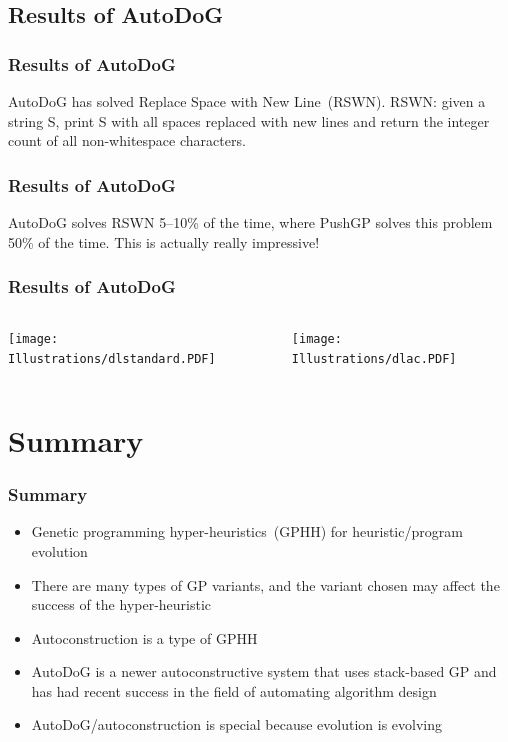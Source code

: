 \documentclass{beamer}
\newcommand{\linespace}{\vskip 0.25cm}
\begin{document}
\subsection{Results of AutoDoG}

\begin{frame}
	\frametitle{Results of AutoDoG}
	AutoDoG has solved Replace Space with New Line~(RSWN).
	\linespace
	\linespace
	\pause
	RSWN: given a string S, print S with all spaces replaced with new lines and return the integer count of all non-whitespace characters.
\end{frame}

\begin{frame}
	\frametitle{Results of AutoDoG}
	AutoDoG solves RSWN 5--10\% of the time, where PushGP solves this problem 50\% of the time.
	\linespace
	\linespace
	\pause
	\centering
	This is actually really impressive!
\end{frame}

\begin{frame}
	\frametitle{Results of AutoDoG}
	\begin{columns}
		\begin{column}{.5\textwidth}
			\texttt{[image: Illustrations/dlstandard.PDF]}
		\end{column}
		\begin{column}{.5\textwidth}
			\texttt{[image: Illustrations/dlac.PDF]}
		\end{column}
	\end{columns}
	\linespace
	\centering
\end{frame}


\section[Summary]{Summary}

\begin{frame}
	\frametitle{Summary}
	\begin{itemize}
		\item Genetic programming hyper-heuristics~(GPHH) for heuristic/program evolution
		\linespace
		\pause
		\item There are many types of GP variants, and the variant chosen may affect the success of the hyper-heuristic
		\linespace
		\pause
		\item Autoconstruction is a type of GPHH
		\linespace
		\pause
		\item AutoDoG is a newer autoconstructive system that uses stack-based GP and has had recent success in the field of automating algorithm design
		\linespace
		\pause
		\item AutoDoG/autoconstruction is special because evolution is evolving
		\linespace
	\end{itemize}
\end{frame}
\end{document}
